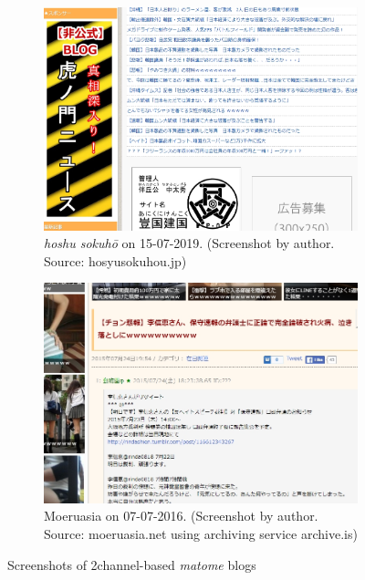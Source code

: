 \documentclass[10pt,british,A4paper,,openany]{memoir}
\begin{document}
\begin{figure}[!htb]
 \centering
 \begin{subfigure}[b]{0.45\textwidth}
  \includegraphics[width=\textwidth]{images/2channel/hoshusokuho.jpg}
  \caption{\textit{hoshu sokuhō} on 15-07-2019. (Screenshot by author. Source: hosyusokuhou.jp)}
  \label{fig:hoshusokuho}
 \end{subfigure}
  \begin{subfigure}[b]{0.45\textwidth}
  \includegraphics[width=\textwidth]{images/2channel/moeruasia.jpg}
  \caption{Moeruasia on 07-07-2016. (Screenshot by author. Source: moeruasia.net using archiving service archive.is)}
  \label{fig:moeruasia}
 \end{subfigure}
 \caption{Screenshots of 2channel-based \textit{matome} blogs}\label{fig:matome-examples}
\end{figure}
\end{document}

